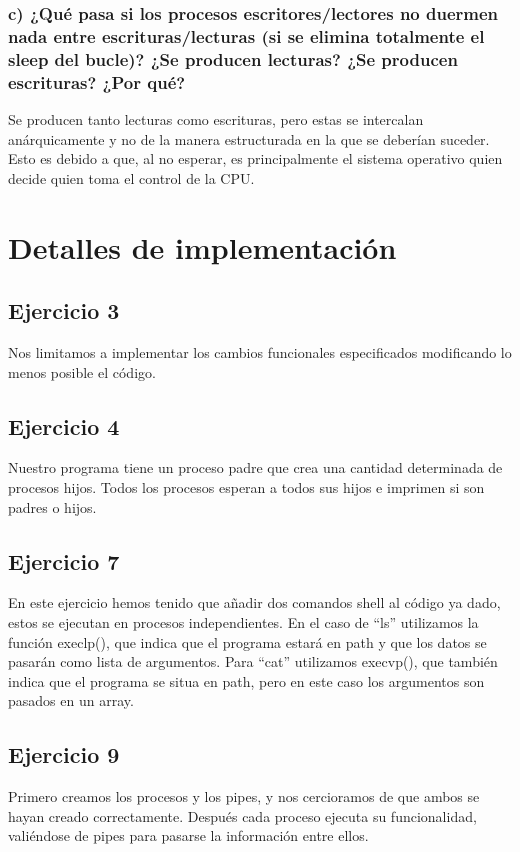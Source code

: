 \documentclass[]{article}
\begin{document}
\subsubsection*{c) ¿Qué pasa si los procesos escritores/lectores no duermen nada entre escrituras/lecturas (si se elimina totalmente el sleep del bucle)? ¿Se producen lecturas? ¿Se producen escrituras? ¿Por qué?}
Se producen tanto lecturas como escrituras, pero estas se intercalan anárquicamente y no de la manera estructurada en la que se deberían suceder. Esto es debido a que, al no esperar, es principalmente el sistema operativo quien decide quien toma el control de la CPU.


\section*{Detalles de implementación}
\subsection*{Ejercicio 3}
Nos limitamos a implementar los cambios funcionales especificados modificando lo menos posible el código.

\subsection*{Ejercicio 4}
Nuestro programa tiene un proceso padre que crea una cantidad determinada de procesos hijos. Todos los procesos esperan a todos sus hijos e imprimen si son padres o hijos.

\subsection*{Ejercicio 7}
En este ejercicio hemos tenido que añadir dos comandos shell al código ya dado, estos se ejecutan en procesos independientes. En el caso de ``ls'' utilizamos la función execlp(), que indica que el programa estará en path y que los datos se pasarán como lista de argumentos. Para ``cat'' utilizamos execvp(), que también indica que el programa se situa en path, pero en este caso los argumentos son pasados en un array.

\subsection*{Ejercicio 9}
Primero creamos los procesos y los pipes, y nos cercioramos de que ambos se hayan creado correctamente. Después cada proceso ejecuta su funcionalidad, valiéndose de pipes para pasarse la información entre ellos.
\end{document}
